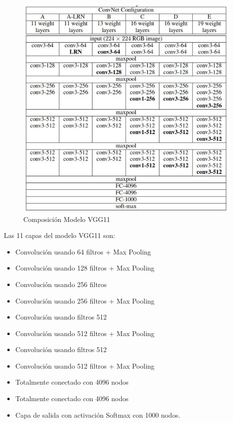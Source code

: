 			\begin{figure}[ht]
				\centering
				\includegraphics[scale=0.8]{Figs/70.png}
				\caption{Composición Modelo VGG11}
				\label{fig:VGG11}
			\end{figure}
\newpage			
			Las 11 capas del modelo VGG11 son:
				\begin{itemize}
					\item Convolución usando 64 filtros + Max Pooling
					\item Convolución usando 128 filtros + Max Pooling
					\item Convolución usando 256 filtros
					\item Convolución usando 256 filtros + Max Pooling
					\item Convolución usando filtros 512
					\item Convolución usando 512 filtros + Max Pooling
					\item Convolución usando filtros 512
					\item Convolución usando 512 filtros + Max Pooling
					\item Totalmente conectado con 4096 nodos
					\item Totalmente conectado con 4096 nodos
					\item Capa de salida con activación Softmax con 1000 nodos.
				\end{itemize}
			

